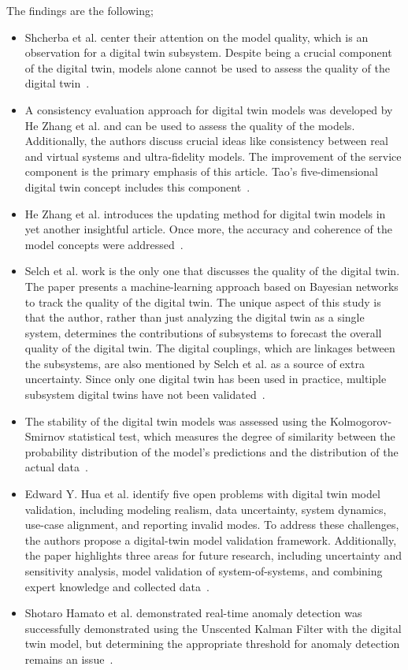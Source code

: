 \documentclass[9pt,conference]{IEEEtran}
\begin{document}
    The findings are the following;
    \begin{itemize}
        \item Shcherba et al. center their attention on the model quality, which is an observation for a digital twin subsystem. Despite being a crucial component of the digital twin, models alone cannot be used to assess the quality of the digital twin~\cite{Shcherba}.
        \item A consistency evaluation approach for digital twin models was developed by He Zhang et al. and can be used to assess the quality of the models. Additionally, 
        the authors discuss crucial ideas like consistency between real and virtual systems and ultra-fidelity models. The improvement of the service component is the primary emphasis of this article. Tao's five-dimensional digital twin concept includes this component~\cite{ZHANGEVALUATIONMETHOD}.
        \item He Zhang et al. introduces the updating method for digital twin models in yet another insightful article. Once more, the accuracy and coherence of the model concepts were addressed~\cite{ZHANGUPDATEMETHOD}.
        \item Selch et al. work is the only one that discusses the quality of the digital twin. The paper presents a machine-learning approach based on Bayesian networks to track the quality of the digital twin. The unique aspect of this study is that the author, rather than just analyzing the digital twin as a single system, determines the contributions of subsystems to forecast the overall quality of the digital twin. The digital couplings, which are linkages between the subsystems, are also mentioned by Selch et al. as a source of extra uncertainty. 
        Since only one digital twin has been used in practice, multiple subsystem digital twins have not been validated~\cite{QualityMonitoringofCoupledDigitalTwins}.
        \item The stability of the digital twin models was assessed using the Kolmogorov-Smirnov statistical test, which measures the degree of similarity between the probability distribution of the model's predictions and the distribution of the actual data~\cite{RadarDigitalTwin}.
        \item Edward Y. Hua et al. identify five open problems with digital twin model validation, including modeling realism, data uncertainty, system dynamics, use-case alignment, and reporting invalid modes. To address these challenges, the authors propose a digital-twin model validation framework. Additionally, the paper highlights three areas for future research, 
        including uncertainty and sensitivity analysis, model validation of system-of-systems, and combining expert knowledge and collected data~\cite{ValidationofDigitalTwins}.
        \item Shotaro Hamato et al. demonstrated real-time anomaly detection was successfully demonstrated using the Unscented Kalman Filter with the digital twin model, but determining the appropriate threshold for anomaly detection remains an issue~\cite{JapeneseKalmanFilterCorrectness}.
    \end{itemize}
\end{document}
